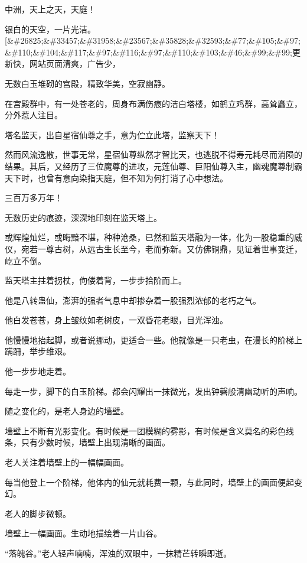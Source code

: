 
\begin{this_body}

中洲，天上之天，天庭！

银白的天空，一片光洁。[\&\#26825;\&\#33457;\&\#31958;\&\#23567;\&\#35828;\&\#32593;\&\#77;\&\#105;\&\#97;\&\#110;\&\#104;\&\#117;\&\#97;\&\#116;\&\#97;\&\#110;\&\#103;\&\#46;\&\#99;\&\#99;更新快，网站页面清爽，广告少，

无数白玉堆砌的宫殿，精致华美，空寂幽静。

在宫殿群中，有一处苍老的，周身布满伤痕的洁白塔楼，如鹤立鸡群，高耸矗立，分外惹人注目。

塔名监天，出自星宿仙尊之手，意为伫立此塔，监察天下！

然而风流逸散，世事无常，星宿仙尊纵然才智比天，也逃脱不得寿元耗尽而消陨的结果。其后，又经历了三位魔尊的进攻，元莲仙尊、巨阳仙尊入主，幽魂魔尊制霸天下时，也曾有意向染指天庭，但不知为何打消了心中想法。

三百万多万年！

无数历史的痕迹，深深地印刻在监天塔上。

或辉煌灿烂，或晦黯不堪，种种沧桑，已然和监天塔融为一体，化为一股稳重的威仪，宛若一尊古树，从远古生长至今，老而弥新。又仿佛铜鼎，见证着世事变迁，屹立不倒。

监天塔主拄着拐杖，佝偻着背，一步步拾阶而上。

他是八转蛊仙，澎湃的强者气息中却掺杂着一股强烈浓郁的老朽之气。

他白发苍苍，身上皱纹如老树皮，一双昏花老眼，目光浑浊。

他慢慢地抬起脚，或者说挪动，更适合一些。他就像是一只老虫，在漫长的阶梯上蹒跚，举步维艰。

他一步步地走着。

每走一步，脚下的白玉阶梯。都会闪耀出一抹微光，发出钟磬般清幽动听的声响。

随之变化的，是老人身边的墙壁。

墙壁上不断有光影变化。有时候是一团模糊的雾影，有时候是含义莫名的彩色线条，只有少数时候，墙壁上出现清晰的画面。

老人关注着墙壁上的一幅幅画面。

每当他登上一个阶梯，他体内的仙元就耗费一颗，与此同时，墙壁上的画面便起变幻。

老人的脚步微顿。

墙壁上一幅画面。生动地描绘着一片山谷。

“落魄谷。”老人轻声喃喃，浑浊的双眼中，一抹精芒转瞬即逝。


\end{this_body}
